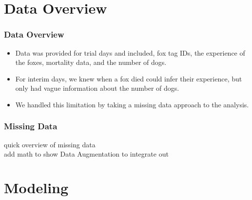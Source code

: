 \documentclass{beamer}
\begin{document}
\section{Data Overview}
\begin{frame}
	\frametitle{Data Overview}
		\begin{itemize}
			\item Data was provided for trial days and included, fox tag IDs, the experience of the foxes, mortality data, and the number of dogs.
			\item For interim days, we knew when a fox died could infer their experience, but only had vague information about the number of dogs.
			\item We handled this limitation by taking a missing data approach to the analysis.
		\end{itemize}
	\end{frame}

\begin{frame}
	\frametitle{Missing Data}
	quick overview of missing data \\
	add math to show Data Augmentation to integrate out
	\end{frame}
\section{Modeling}
\end{document}
